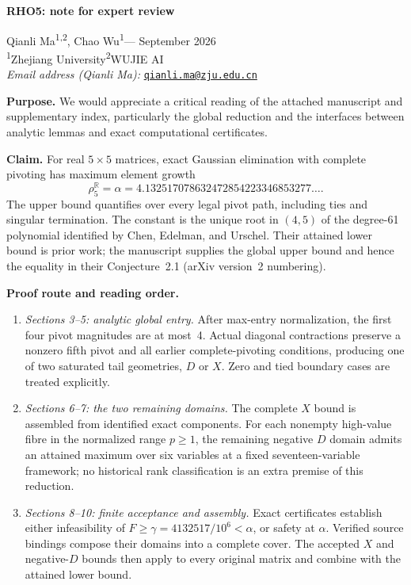 \documentclass[10pt]{article}
\begin{document}
{\Large\bfseries RHO5: note for expert review}\par
Qianli Ma\textsuperscript{1,2}, Chao Wu\textsuperscript{1}\quad--- September 2026\\
\textsuperscript{1}Zhejiang University\qquad\textsuperscript{2}WUJIE AI\\
\textit{Email address (Qianli Ma):} \href{mailto:qianli.ma@zju.edu.cn}{\texttt{qianli.ma@zju.edu.cn}}

\textbf{Purpose.} We would appreciate a critical reading of the attached
manuscript and supplementary index, particularly the global reduction and the interfaces
between analytic lemmas and exact computational certificates.

\textbf{Claim.} For real \(5\times5\) matrices, exact Gaussian elimination
with complete pivoting has maximum element growth
\[
\rho_5^{\mathbb R}=\alpha
=4.132517078632472854223346853277\ldots.
\]
The upper bound quantifies over every legal pivot path, including ties
and singular termination. The constant is the unique root in \((4,5)\)
of the degree-61 polynomial identified by Chen, Edelman, and Urschel.
Their attained lower bound is prior work; the manuscript supplies the
global upper bound and hence the equality in their Conjecture~2.1
(arXiv version~2 numbering).

\textbf{Proof route and reading order.}
\begin{enumerate}
\setlength{\itemsep}{2pt}
\item \textit{Sections 3--5: analytic global entry.}
After max-entry normalization, the first four pivot magnitudes are
at most~4. Actual diagonal contractions
preserve a nonzero fifth pivot and all earlier complete-pivoting
conditions, producing one of two saturated tail geometries, \(D\) or \(X\).
Zero and tied boundary cases are treated explicitly.
\item \textit{Sections 6--7: the two remaining domains.}
The complete \(X\) bound is assembled from identified exact components.
For each nonempty high-value fibre in the normalized range \(p\ge1\),
the remaining negative \(D\) domain admits an attained maximum over six
variables at a fixed seventeen-variable framework; no
historical rank classification is an extra premise of this reduction.
\item \textit{Sections 8--10: finite acceptance and assembly.}
Exact certificates establish either infeasibility of
\(F\ge\gamma=4132517/10^6<\alpha\), or safety at \(\alpha\).
Verified source bindings compose their domains into a complete cover.
The accepted \(X\) and negative-\(D\) bounds then apply to every original
matrix and combine with the attained lower bound.
\end{enumerate}
\end{document}
